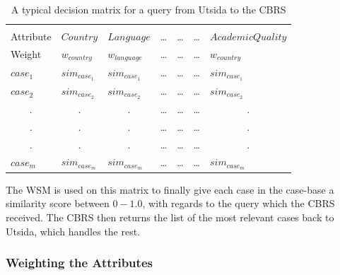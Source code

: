 \begin{table}[H]
\centering
\caption{A typical decision matrix for a query from Utsida to the CBRS}
\label{tab:decision_matrix}
\begin{tabular}{lllcccl}
                      &                       &                       & \multicolumn{1}{l}{} & \multicolumn{1}{l}{} & \multicolumn{1}{l}{} &                       \\
Attribute             & $Country$             & $Language$            & \ldots               & \ldots               & \ldots               & $AcademicQuality$     \\\hline
Weight                & $w_{country}$         & $w_{language}$        & \ldots               & \ldots               & \ldots               & $w_{country}$         \\\hline
$case_{1}$            & $sim_{case_{1}}$      & $sim_{case_{1}}$      & \ldots               & \ldots               & \ldots               & $sim_{case_{1}}$      \\
$case_{2}$            & $sim_{case_{2}}$      & $sim_{case_{2}}$      & \ldots               & \ldots               & \ldots               & $sim_{case_{2}}$      \\
\multicolumn{1}{c}{.} & \multicolumn{1}{c}{.} & \multicolumn{1}{c}{.} & \ldots               & \ldots               & \ldots               & \multicolumn{1}{c}{.} \\
\multicolumn{1}{c}{.} & \multicolumn{1}{c}{.} & \multicolumn{1}{c}{.} & \ldots               & \ldots               & \ldots               & \multicolumn{1}{c}{.} \\
\multicolumn{1}{c}{.} & \multicolumn{1}{c}{.} & \multicolumn{1}{c}{.} & \ldots               & \ldots               & \ldots               & \multicolumn{1}{c}{.} \\
$case_{m}$            & $sim_{case_{m}}$      & $sim_{case_{m}}$      & \ldots               & \ldots               & \ldots               & $sim_{case_{m}}$     
\end{tabular}
\end{table}

The WSM is used on this matrix to finally give each case in the case-base a similarity score between $0-1.0$, with regards to the query which the CBRS received. The CBRS then returns the list of the most relevant cases back to Utsida, which handles the rest.


\subsubsection{Weighting the Attributes}

